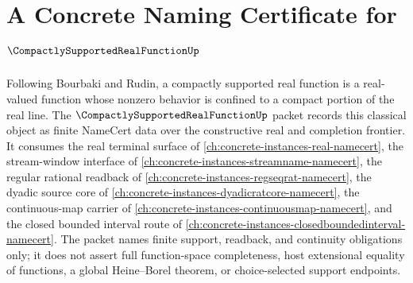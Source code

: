 \chapter{A Concrete Naming Certificate for $\CompactlySupportedRealFunctionUp$}
\label{ch:concrete-instances-compactly-supported-real-function-namecert}

Following Bourbaki and Rudin, a compactly supported real function is a real-valued function whose nonzero behavior is confined to a compact portion of the real line. The $\CompactlySupportedRealFunctionUp$ packet records this classical object as finite NameCert data over the constructive real and completion frontier. It consumes the real terminal surface of \autoref{ch:concrete-instances-real-namecert}, the stream-window interface of \autoref{ch:concrete-instances-streamname-namecert}, the regular rational readback of \autoref{ch:concrete-instances-regseqrat-namecert}, the dyadic source core of \autoref{ch:concrete-instances-dyadicratcore-namecert}, the continuous-map carrier of \autoref{ch:concrete-instances-continuousmap-namecert}, and the closed bounded interval route of \autoref{ch:concrete-instances-closedboundedinterval-namecert}. The packet names finite support, readback, and continuity obligations only; it does not assert full function-space completeness, host extensional equality of functions, a global Heine--Borel theorem, or choice-selected support endpoints.

